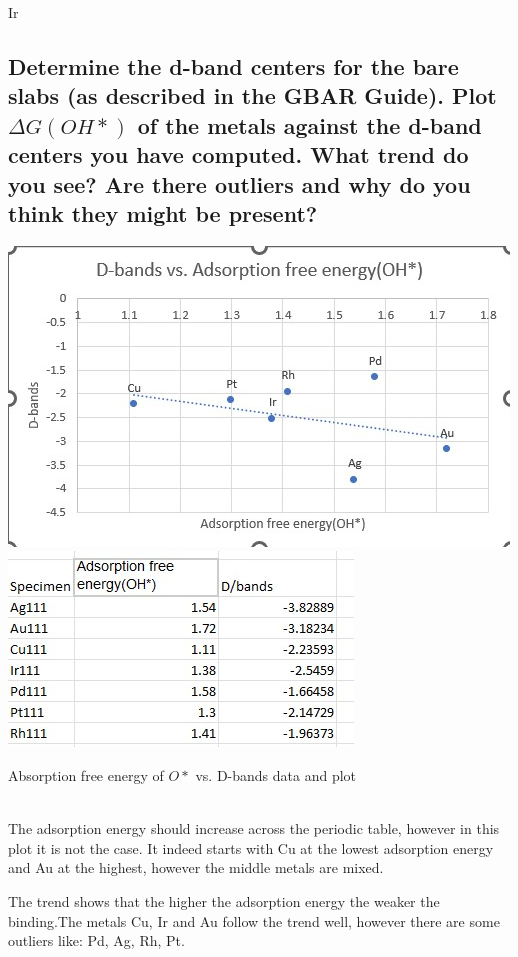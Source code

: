 Ir\documentclass{article}
\begin{document}
\subsection{Determine the d-band centers for the bare slabs (as described in the GBAR
Guide). Plot $\Delta G(OH \ast)$ of the metals against the d-band centers you have
computed. What trend do you see? Are there outliers and why do you think
they might be present?}

\begin{center}
\includegraphics{pictures/6.3.jpg}
\includegraphics{data d.jpg}
\caption{Absorption free energy of $O\ast$ vs. D-bands data and plot}
\end{center}

 \\

The adsorption energy should increase across the periodic table, however in this plot it is not the case. It indeed starts with Cu at the lowest adsorption energy and Au at the highest, however the middle metals are mixed. 

The trend shows that the higher the adsorption energy the weaker the binding.The metals Cu, Ir and Au follow the trend well, however there are some outliers like: Pd, Ag, Rh, Pt. 
\end{document}
